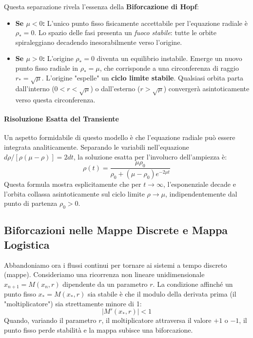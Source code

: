 \documentclass[12pt,a4paper]{article}
\begin{document}
Questa separazione rivela l'essenza della \textbf{Biforcazione di Hopf}:
\begin{itemize}
    \item \textbf{Se $\mu < 0$:} L'unico punto fisso fisicamente accettabile per l'equazione radiale è $\rho_* = 0$. Lo spazio delle fasi presenta un \textit{fuoco stabile}: tutte le orbite spiraleggiano decadendo inesorabilmente verso l'origine.
    \item \textbf{Se $\mu > 0$:} L'origine $\rho_* = 0$ diventa un equilibrio instabile. Emerge un nuovo punto fisso radiale in $\rho_* = \mu$, che corrisponde a una circonferenza di raggio $r_* = \sqrt{\mu}$. L'origine "espelle" un \textbf{ciclo limite stabile}. Qualsiasi orbita parta dall'interno ($0 < r < \sqrt{\mu}$) o dall'esterno ($r > \sqrt{\mu}$) convergerà asintoticamente verso questa circonferenza.
\end{itemize}

\paragraph{Risoluzione Esatta del Transiente}
Un aspetto formidabile di questo modello è che l'equazione radiale può essere integrata analiticamente. Separando le variabili nell'equazione $d\rho / [\rho(\mu - \rho)] = 2 dt$, la soluzione esatta per l'involucro dell'ampiezza è:
\begin{equation}
\rho(t) = \frac{\mu \rho_0}{\rho_0 + (\mu - \rho_0)e^{-2\mu t}}
\end{equation}
Questa formula mostra esplicitamente che per $t \to \infty$, l'esponenziale decade e l'orbita collassa asintoticamente sul ciclo limite $\rho \to \mu$, indipendentemente dal punto di partenza $\rho_0 > 0$.

\subsection{Biforcazioni nelle Mappe Discrete e Mappa Logistica}
Abbandoniamo ora i flussi continui per tornare ai sistemi a tempo discreto (mappe). Consideriamo una ricorrenza non lineare unidimensionale $x_{n+1} = M(x_n, r)$ dipendente da un parametro $r$. 
La condizione affinché un punto fisso $x_* = M(x_*, r)$ sia stabile è che il modulo della derivata prima (il "moltiplicatore") sia strettamente minore di 1:
\begin{equation}
|M'(x_*, r)| < 1
\end{equation}
Quando, variando il parametro $r$, il moltiplicatore attraversa il valore $+1$ o $-1$, il punto fisso perde stabilità e la mappa subisce una biforcazione.
\end{document}
